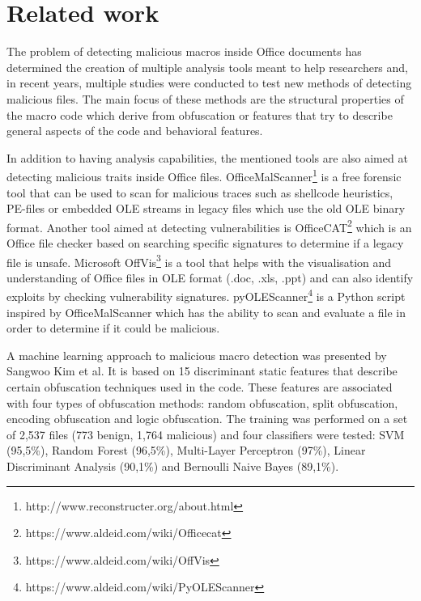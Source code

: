 \section{Related work}
The problem of detecting malicious macros inside Office documents has determined the creation of multiple analysis tools meant to help researchers and, in recent years, multiple studies were conducted to test new methods of detecting malicious files. The main focus of these methods are the structural properties of the macro code which derive from obfuscation or features that try to describe general aspects of the code and behavioral features. 
\par
In addition to having analysis capabilities, the mentioned tools are also aimed at detecting malicious traits inside Office files. OfficeMalScanner\footnote{http://www.reconstructer.org/about.html} is a free forensic tool that can be used to scan for malicious traces such as shellcode heuristics, PE-files or embedded OLE streams in legacy files which use the old OLE binary format. Another tool aimed at detecting vulnerabilities is OfficeCAT\footnote{https://www.aldeid.com/wiki/Officecat} which is an Office file checker based on searching specific signatures to determine if a legacy file is unsafe. Microsoft OffVis\footnote{https://www.aldeid.com/wiki/OffVis} is a tool that helps with the visualisation and understanding of Office files in OLE format (.doc, .xls, .ppt) and can also identify exploits by checking vulnerability signatures. pyOLEScanner\footnote{https://www.aldeid.com/wiki/PyOLEScanner} is a Python script inspired by OfficeMalScanner which has the ability to scan and evaluate a file in order to determine if it could be malicious.
\par
A machine learning approach to malicious macro detection was presented by Sangwoo Kim et al.\cite{KimHOL18} It is based on 15 discriminant static features that describe certain obfuscation techniques used in the code. These features are associated with four types of obfuscation methods: random obfuscation, split obfuscation, encoding obfuscation and logic obfuscation. The training was performed on a set of 2,537 files (773 benign, 1,764 malicious) and four classifiers were tested: SVM (95,5\%), Random Forest (96,5\%), Multi-Layer Perceptron (97\%), Linear Discriminant Analysis (90,1\%) and Bernoulli Naive Bayes (89,1\%). 
\par
